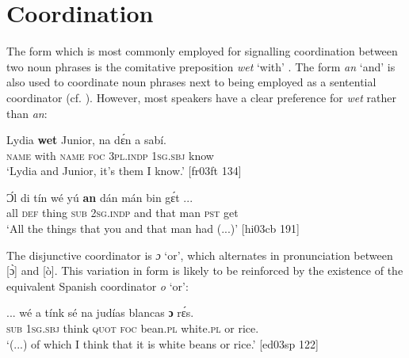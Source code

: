 \section{Coordination}\label{sec:5.5}
The form which is most commonly employed for signalling coordination between two noun phrases is the comitative preposition \textit{wet} ‘with’ . The form \textit{an} ‘and’ is also used to coordinate noun phrases  next to being employed as a sentential coordinator (cf. ). However, most speakers have a clear preference for \textit{wet} rather than \textit{an}: 


\ea%
    \label{ex:key:297}
    \gll Lydia  \textbf{wet}    Junior,  na  dɛ́n    a    sabí.\\
\textsc{name}  with    \textsc{name}  \textsc{foc}  \textsc{3pl.indp}  \textsc{1sg.sbj}  know\\

\glt ‘Lydia and Junior, it’s them I know.’ [fr03ft 134]
\z


\ea%
    \label{ex:key:298}
    \gll Ɔ́l  di  tín    wé  yú    \textbf{an}  dán  mán    bin  gɛ́t \op...\cp{}\\
all  \textsc{def}  thing  \textsc{sub}  \textsc{2sg.indp}  and  that  man    \textsc{pst}  get\\

\glt ‘All the things that you and that man had (...)’ [hi03cb 191]
\z

The disjunctive coordinator is \textit{ɔ} ‘or’, which alternates in pronunciation between [ɔ̀] and [ò]. This variation in form is likely to be reinforced by the existence of the equivalent Spanish coordinator \textit{o} ‘or’:


\ea%
    \label{ex:key:299}
    \gll \op...\cp{}  wé  a    tínk    sé    na  judías  blancas  \textbf{ɔ}  rɛ́s.\\
 {}  \textsc{sub}  \textsc{1sg.sbj}  think  \textsc{quot}    \textsc{foc}  bean.\textsc{pl}  white.\textsc{pl}  or  rice.\\

\glt ‘(...) of which I think that it is white beans or rice.’ [ed03sp 122]
\z

